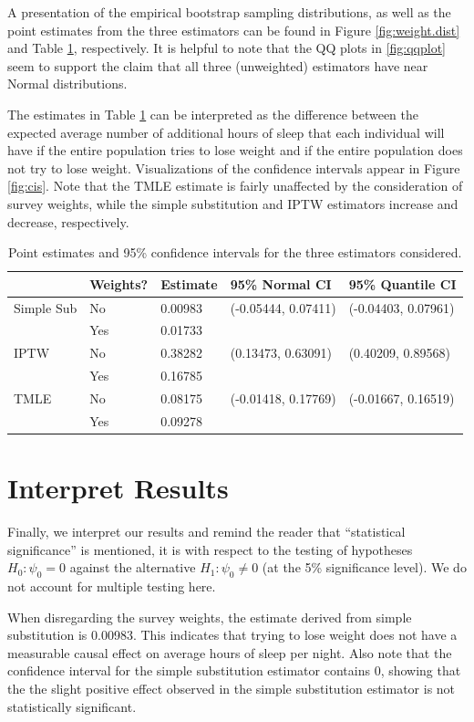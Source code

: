 \documentclass{article}
\begin{document}
A presentation of the empirical bootstrap sampling distributions, as well as the point estimates from the three estimators can be found in Figure \ref{fig:weight.dist} and Table \ref{tab:ests}, respectively. It is helpful to note that the QQ plots in \ref{fig:qqplot} seem to support the claim that all three (unweighted) estimators have near Normal distributions. 

The estimates in Table \ref{tab:ests}   can be interpreted as the difference between the expected average number of additional hours of sleep that each individual will have if the entire population tries to lose weight and if the entire population does not try to lose weight. Visualizations of the confidence intervals appear in Figure \ref{fig:cis}. Note that the TMLE estimate is fairly unaffected by the consideration of survey weights, while the simple substitution and IPTW estimators increase and decrease, respectively.

\begin{table}[hbt]
\centering
\begin{tabular}{| l| l | l | l | l |}
  \hline
 & Weights? & Estimate & 95\% Normal CI & 95\% Quantile CI \\ 
  \hline
Simple Sub & No & 0.00983 & (-0.05444, 0.07411) & (-0.04403, 0.07961) \\ 
& Yes & 0.01733 & & \\
\hline
  IPTW & No & 0.38282 & (0.13473, 0.63091) & (0.40209, 0.89568) \\ 
& Yes & 0.16785 & & \\
\hline
  TMLE & No & 0.08175 & (-0.01418, 0.17769) & (-0.01667, 0.16519) \\ 
& Yes & 0.09278 & & \\
   \hline
\end{tabular}
\caption{Point estimates and 95\% confidence intervals for the three estimators considered.}
\label{tab:ests}
\end{table}

\section{Interpret Results}
Finally, we interpret our results and remind the reader that ``statistical significance'' is mentioned, it is with respect to the testing of hypotheses $H_0 : \psi_0 = 0$ against the alternative $H_1 : \psi_{0} \neq 0$ (at the 5\% significance level). We do not account for multiple testing here.

When disregarding the survey weights, the estimate derived from simple substitution is 0.00983. This indicates that trying to lose weight does not have a measurable causal effect on average hours of sleep per night. Also note that the confidence interval for the simple substitution estimator contains $0$, showing that the the slight positive effect observed in the simple substitution estimator is not statistically significant.
\end{document}
